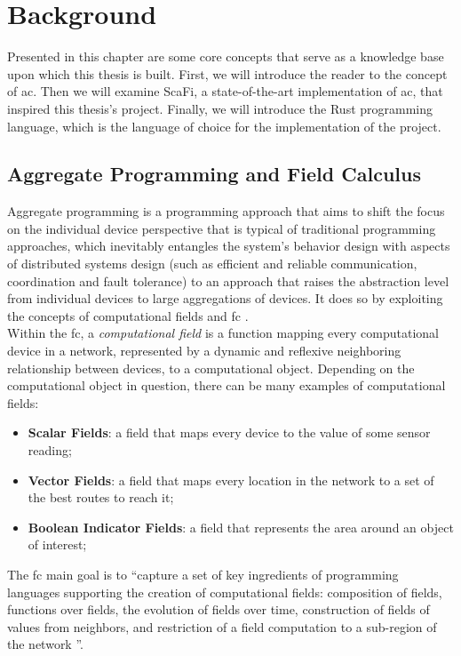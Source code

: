 
\chapter{Background}
\label{chap:background}
Presented in this chapter are some core concepts that serve as a knowledge base upon which this thesis is built.
First, we will introduce the reader to the concept of \ac{ac}. Then we will examine ScaFi, a state-of-the-art implementation of \ac{ac}, that inspired this thesis's project.
Finally, we will introduce the Rust programming language, which is the language of choice for the implementation of the project.

\section{Aggregate Programming and Field Calculus}
Aggregate programming \cite{Beal2016} is a programming approach that aims to shift the focus on the individual device perspective that is typical of traditional programming approaches, which
inevitably entangles the system's behavior design with aspects of distributed systems design (such as efficient and reliable communication, coordination and fault tolerance) to an approach that raises
the abstraction level from individual devices to large aggregations of devices. It does so by exploiting the concepts of computational fields and \ac{fc} \cite{10.1145/3285956, 10.1007/978-3-642-45364-9_11}.\\

Within the \ac{fc}, a \textit{computational field} is a function mapping every computational device in a network, represented by a dynamic and reflexive neighboring relationship between devices, to a computational object.
Depending on the computational object in question, there can be many examples of computational fields:
\begin{itemize}
    \item \textbf{Scalar Fields}: a field that maps every device to the value of some sensor reading;
    \item \textbf{Vector Fields}: a field that maps every location in the network to a set of the best routes to reach it;
    \item \textbf{Boolean Indicator Fields}: a field that represents the area around an object of interest;
\end{itemize}

The \ac{fc} main goal is to ``capture a set of key ingredients of programming languages supporting the creation of computational fields: composition of fields, functions
over fields, the evolution of fields over time, construction of fields of values from neighbors, and restriction of a field computation to a sub-region of the network \cite{10.1007/978-3-642-45364-9_11}''.

